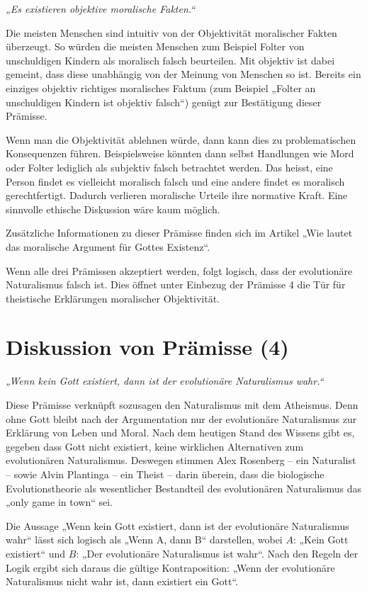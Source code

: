 \documentclass[11pt,a4paper]{article}
\begin{document}
	\textit{„Es existieren objektive moralische Fakten.“}
	
	Die meisten Menschen sind intuitiv von der Objektivität moralischer Fakten überzeugt. So würden die meisten Menschen zum Beispiel Folter von unschuldigen Kindern als moralisch falsch beurteilen. Mit objektiv ist dabei gemeint, dass diese unabhängig von der Meinung von Menschen so ist. Bereits ein einziges objektiv richtiges moralisches Faktum (zum Beispiel „Folter an unschuldigen Kindern ist objektiv falsch“) genügt zur Bestätigung dieser Prämisse.
	
	Wenn man die Objektivität ablehnen würde, dann kann dies zu problematischen Konsequenzen führen. Beispielsweise könnten dann selbst Handlungen wie Mord oder Folter lediglich als subjektiv falsch betrachtet werden. Das heisst, eine Person findet es vielleicht moralisch falsch und eine andere findet es moralisch gerechtfertigt. Dadurch verlieren moralische Urteile ihre normative Kraft. Eine sinnvolle ethische Diskussion wäre kaum möglich.
	
	Zusätzliche Informationen zu dieser Prämisse finden sich im Artikel „Wie lautet das moralische Argument für Gottes Existenz“.
	
	Wenn alle drei Prämissen akzeptiert werden, folgt logisch, dass der evolutionäre Naturalismus falsch ist. Dies öffnet unter Einbezug der Prämisse 4 die Tür für theistische Erklärungen moralischer Objektivität.
	
	\section{Diskussion von Prämisse (4)}
	
	\textit{„Wenn kein Gott existiert, dann ist der evolutionäre Naturalismus wahr.“}
	
	Diese Prämisse verknüpft sozusagen den Naturalismus mit dem Atheismus. Denn ohne Gott bleibt nach der Argumentation nur der evolutionäre Naturalismus zur Erklärung von Leben und Moral. Nach dem heutigen Stand des Wissens gibt es, gegeben dass Gott nicht existiert, keine wirklichen Alternativen zum evolutionären Naturalismus. Deswegen stimmen Alex Rosenberg – ein Naturalist – sowie Alvin Plantinga – ein Theist – darin überein, dass die biologische Evolutionstheorie als wesentlicher Bestandteil des evolutionären Naturalismus das „only game in town“ sei.
	
	Die Aussage „Wenn kein Gott existiert, dann ist der evolutionäre Naturalismus wahr“ lässt sich logisch als „Wenn A, dann B“ darstellen, wobei \(A\): „Kein Gott existiert“ und \(B\): „Der evolutionäre Naturalismus ist wahr“. Nach den Regeln der Logik ergibt sich daraus die gültige Kontraposition: „Wenn der evolutionäre Naturalismus nicht wahr ist, dann existiert ein Gott“.
	
\end{document}
